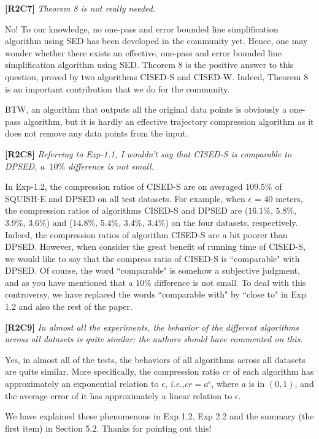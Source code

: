 \documentclass{letter}
\newcommand{\ie}{\emph{i.e.,}\xspace}
\begin{document}
\textbf{[R2C7]} \emph{Theorem 8 is not really needed.}

No! To our knowledge, no one-pass and error bounded line simplification algorithm using SED has been developed in the community yet. Hence, one may wonder whether there exists an effective, one-pass and error bounded line simplification algorithm using SED. Theorem 8 is the positive answer to this question, proved by two algorithms CISED-S and CISED-W. Indeed, Theorem 8 is an important contribution that we do for the community. 

BTW, an algorithm that outputs all the original data points is obviously a one-pass algorithm, but it is hardly an effective trajectory compression algorithm as it does not remove any data points from the input.

\textbf{[R2C8]} \emph{Referring to Exp-1.1, I wouldn't say that CISED-S is comparable to DPSED, a $~10\%$ difference is not small.}

In Exp-1.2, the compression ratios of CISED-S are on averaged $109.5\%$ of SQUISH-E and DPSED on all test datasets. For example, when $\epsilon$ = $40$ meters, the compression ratios of algorithms CISED-S and DPSED are ($16.1\%$, $5.8\%$, $3.9\%$, $3.6\%$) and ($14.8\%$, $5.4\%$, $3.4\%$, $3.4\%$) on the four datasets, respectively. Indeed, the compression ratios of algorithm CISED-S are a bit poorer than DPSED. However, when consider the great benefit of running time of CISED-S, we would like to say that the compress ratio of CISED-S is ``comparable" with DPSED. 
%
Of course, the word ``comparable" is somehow a subjective judgment, and as you have mentioned that a $10\%$ difference is not small. To deal with this controversy, we have replaced the words ``comparable with" by ``close to" in Exp 1.2 and also the rest of the paper.


\textbf{[R2C9]} \emph{In almost all the experiments, the behavior of the different algorithms across all datasets is quite similar; the authors should have commented on this.}

Yes, in almost all of the tests, the behaviors of all algorithms across all datasets are quite similar. More specifically, the compression ratio $cr$ of each algorithm has approximately an exponential relation to $\epsilon$, \ie $cr=a^\epsilon$, where $a$ is in $(0,1)$, and the average error of it has approximately a linear relation to $\epsilon$. 

We have explained these phenomenons in Exp 1.2, Exp 2.2 and the summary (the first item) in Section 5.2. Thanks for pointing out this!
\end{document}
